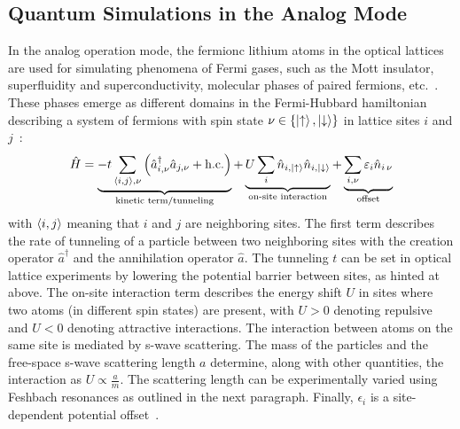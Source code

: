 \subsection*{Quantum Simulations in the Analog Mode}
In the analog operation mode, the fermionc lithium atoms in the optical lattices are used for simulating phenomena of Fermi gases, such as the Mott insulator, superfluidity and  superconductivity, molecular phases of paired fermions, etc.~\cite{bloch_quantum_2012}. These phases emerge as different domains in the Fermi-Hubbard hamiltonian describing a system of fermions with spin state $\nu \in \{\Ket{\uparrow}, \Ket{\downarrow}\}$ in lattice sites $i$ and $j$~\cite{hubbard_electron_1963,esslinger_fermi-hubbard_2010}:
\begin{align}\label{eq:fermi_hubbard_hamiltonian}
    \hat H =
    \underbrace{-t \sum\limits_{\Braket{i,j}, \nu} \left(\hat a^\dagger_{i, \nu} \hat a_{j, \nu} + \text{h.c.}\right)}_\text{kinetic term/tunneling}
    + \underbrace{U \sum\limits_i \hat n_{i, \Ket{\uparrow}} \hat n_{i, \Ket{\downarrow}}}_\text{on-site interaction}
    + \underbrace{\sum\limits_{i, \nu} \epsilon_{i} \hat n_{i\, \nu}}_\text{offset}
\end{align}
with $\Braket{i,j}$ meaning that $i$ and $j$ are neighboring sites. The first term describes the rate of tunneling of a particle between two neighboring sites with the creation operator $\hat a^\dagger$ and the annihilation operator $\hat a$. The tunneling $t$ can be set in optical lattice experiments by lowering the potential barrier between sites, as hinted at above. The on-site interaction term describes the energy shift $U$ in sites where two atoms (in different spin states) are present, with $U > 0$ denoting repulsive and $U < 0$ denoting attractive interactions. The interaction between atoms on the same site is mediated by s-wave scattering. The mass of the particles and the free-space s-wave scattering length $a$ determine, along with other quantities, the interaction as $U \propto \frac{a}{m}$. The scattering length can be experimentally varied using Feshbach resonances as outlined in the next paragraph. Finally, $\epsilon_i$ is a site-dependent potential offset~\cite{esslinger_fermi-hubbard_2010}.

